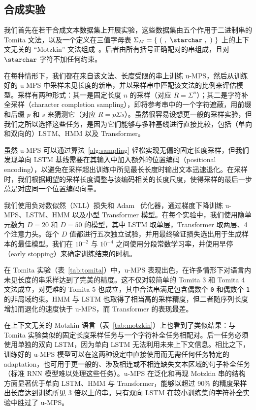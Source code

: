 \subsection{合成实验}

我们首先在若干合成文本数据集上开展实验，这些数据集由五个作用于二进制串的 Tomita 文法，以及一个定义在三值字母表 $\Sigma_{M} = \{\mathtt{\ (\ ,\ \starchar\ ,\ )\ }\}$ 上的上下文无关的 ``Motzkin'' 文法组成~\citep{tomita1982, alexander2018}。后者由所有括号正确配对的串组成，且对 $\mathtt{\starchar}$ 字符不加任何约束。

在每种情形下，我们都在来自该文法、长度受限的串上训练 u-MPS，然后从训练好的 u-MPS 中采样未见长度的新串，并以采样串中匹配该文法的比例来评估模型。采样有两种形式：其一是固定长度 $n$ 的采样（对应 $R = \Sigma^n$）；其二是字符补全采样（character completion sampling），即将参考串中的一个字符遮蔽，用前缀和后缀 $p$ 和 $s$ 来猜测它（对应 $R = p \Sigma s$）。虽然很容易设想更一般的采样实验，但我们之所以选择这些任务，是因为它们能够与多种基线进行直接比较，包括（单向和双向的）LSTM、HMM 以及 Transformer。

虽然 u-MPS 可以通过算法~\ref{alg:sampling} 轻松实现无偏的固定长度采样，但我们发现单向 LSTM 基线需要在其输入中加入额外的位置编码（positional encoding），以避免在采样超出训练中所见最长长度时输出文本迅速退化。在采样时，我们根据期望的采样长度调整与该编码相关的长度尺度，使得采样的最后一步总是对应同一个位置编码向量。

我们使用负对数似然（NLL）损失和 Adam~\citep{kingma2015} 优化器，通过梯度下降训练 u-MPS、LSTM、HMM 以及小型 Transformer 模型。在每个实验中，我们使用隐单元数为 $D=20$ 和 $D=50$ 的模型，其中 LSTM 取单层，Transformer 取两层、4 个注意力头。每个 $D$ 值都进行五次独立试验，并用最终验证损失选出用于生成样本的最佳模型。我们在 $10^{-2}$ 与 $10^{-4}$ 之间使用分段常数学习率，并使用早停（early stopping）来确定训练结束的时机。

在 Tomita 实验（表~\ref{tab:tomita}）中，u-MPS 表现出色，在许多情形下对语言内未见长度的串采样达到了完美的精度。这不仅对较简单的 Tomita 3 和 Tomita 4 文法成立，对更难的 Tomita 5 也成立，其中合法串满足包含偶数个 \texttt{0} 和偶数个 \texttt{1} 的非局域约束。HMM 与 LSTM 也取得了相当高的采样精度，但二者随序列长度增加而退化的速度快于 u-MPS，而 Transformer 的表现最差。

在上下文无关的 Motzkin 语言（表~\ref{tab:motzkin}）上也看到了类似结果：与 Tomita 实验类似的固定长度采样任务与一个字符补全任务相配对。后一任务必须使用单独的双向 LSTM，因为单向 LSTM 无法利用未来上下文信息。相比之下，训练好的 u-MPS 模型可以在这两种设定中直接使用而无需任何任务特定的 adaptation，也可用于更一般的、涉及相连或不相连缺失文本区域的句子补全任务（标准 RNN 模型难以处理这些任务）。u-MPS 在泛化和再现 Motzkin 串的结构方面显著优于单向 LSTM、HMM 与 Transformer，能够以超过 90\% 的精度采样出长度达到训练所见 3 倍以上的串。只有双向 LSTM 在较小训练集的字符补全实验中胜过了 u-MPS。

